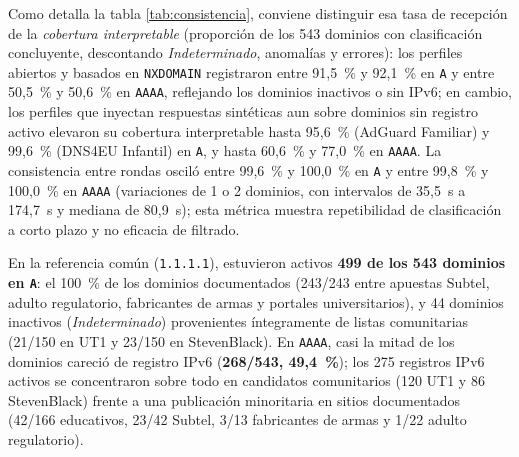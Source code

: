 \documentclass[10pt,a4paper]{article}
\begin{document}
Como detalla la tabla \ref{tab:consistencia}, conviene distinguir esa tasa de recepción de la \emph{cobertura interpretable} (proporción de los 543 dominios con clasificación concluyente, descontando \emph{Indeterminado}, anomalías y errores): los perfiles abiertos y basados en \texttt{NXDOMAIN} registraron entre 91,5~\% y 92,1~\% en \texttt{A} y entre 50,5~\% y 50,6~\% en \texttt{AAAA}, reflejando los dominios inactivos o sin IPv6; en cambio, los perfiles que inyectan respuestas sintéticas aun sobre dominios sin registro activo elevaron su cobertura interpretable hasta 95,6~\% (AdGuard Familiar) y 99,6~\% (DNS4EU Infantil) en \texttt{A}, y hasta 60,6~\% y 77,0~\% en \texttt{AAAA}. La consistencia entre rondas osciló entre 99,6~\% y 100,0~\% en \texttt{A} y entre 99,8~\% y 100,0~\% en \texttt{AAAA} (variaciones de 1 o 2 dominios, con intervalos de 35,5~s a 174,7~s y mediana de 80,9~s); esta métrica muestra repetibilidad de clasificación a corto plazo y no eficacia de filtrado.

En la referencia común (\texttt{1.1.1.1}), estuvieron activos \textbf{499 de los 543 dominios en \texttt{A}}: el 100~\% de los dominios documentados (243/243 entre apuestas Subtel, adulto regulatorio, fabricantes de armas y portales universitarios), y 44 dominios inactivos (\emph{Indeterminado}) provenientes íntegramente de listas comunitarias (21/150 en UT1 y 23/150 en StevenBlack). En \texttt{AAAA}, casi la mitad de los dominios careció de registro IPv6 (\textbf{268/543, 49,4~\%}); los 275 registros IPv6 activos se concentraron sobre todo en candidatos comunitarios (120 UT1 y 86 StevenBlack) frente a una publicación minoritaria en sitios documentados (42/166 educativos, 23/42 Subtel, 3/13 fabricantes de armas y 1/22 adulto regulatorio).
\end{document}
